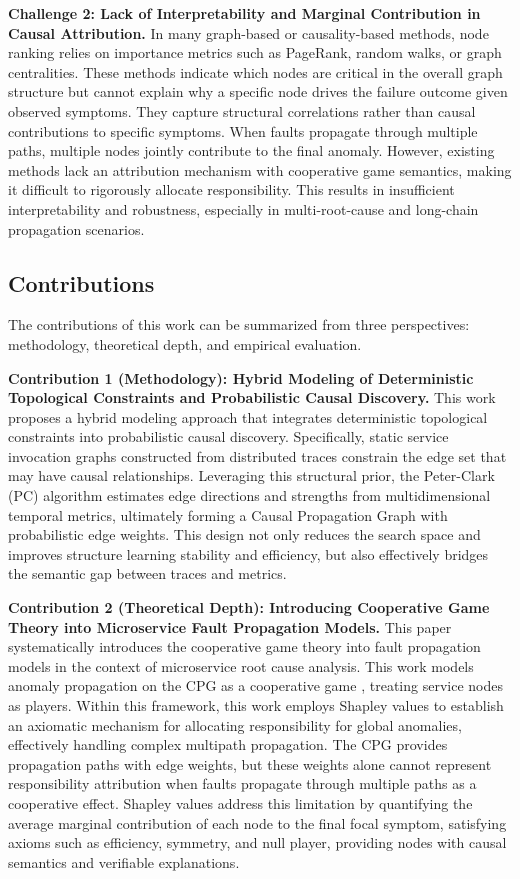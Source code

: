\documentclass[conference]{IEEEtran}
\begin{document}
\textbf{Challenge 2: Lack of Interpretability and Marginal Contribution in Causal Attribution.} In many graph-based or causality-based methods, node ranking relies on importance metrics such as PageRank, random walks, or graph centralities. These methods indicate which nodes are critical in the overall graph structure but cannot explain why a specific node drives the failure outcome given observed symptoms. They capture structural correlations rather than causal contributions to specific symptoms. When faults propagate through multiple paths, multiple nodes jointly contribute to the final anomaly. However, existing methods lack an attribution mechanism with cooperative game semantics, making it difficult to rigorously allocate responsibility. This results in insufficient interpretability and robustness, especially in multi-root-cause and long-chain propagation scenarios.

\subsection{Contributions}

The contributions of this work can be summarized from three perspectives: methodology, theoretical depth, and empirical evaluation.

\textbf{Contribution 1 (Methodology): Hybrid Modeling of Deterministic Topological Constraints and Probabilistic Causal Discovery.} This work proposes a hybrid modeling approach that integrates deterministic topological constraints into probabilistic causal discovery. Specifically, static service invocation graphs constructed from distributed traces constrain the edge set that may have causal relationships. Leveraging this structural prior, the Peter-Clark (PC) algorithm estimates edge directions and strengths from multidimensional temporal metrics, ultimately forming a Causal Propagation Graph with probabilistic edge weights. This design not only reduces the search space and improves structure learning stability and efficiency, but also effectively bridges the semantic gap between traces and metrics.

\textbf{Contribution 2 (Theoretical Depth): Introducing Cooperative Game Theory into Microservice Fault Propagation Models.} This paper systematically introduces the cooperative game theory into fault propagation models in the context of microservice root cause analysis. This work models anomaly propagation on the CPG as a cooperative game \cite{lundberg2017,heskes2020,janzing2020}, treating service nodes as players. Within this framework, this work employs Shapley values \cite{shapley} to establish an axiomatic mechanism for allocating responsibility for global anomalies, effectively handling complex multipath propagation. The CPG provides propagation paths with edge weights, but these weights alone cannot represent responsibility attribution when faults propagate through multiple paths as a cooperative effect. Shapley values address this limitation by quantifying the average marginal contribution of each node to the final focal symptom, satisfying axioms such as efficiency, symmetry, and null player, providing nodes with causal semantics and verifiable explanations.
\end{document}

